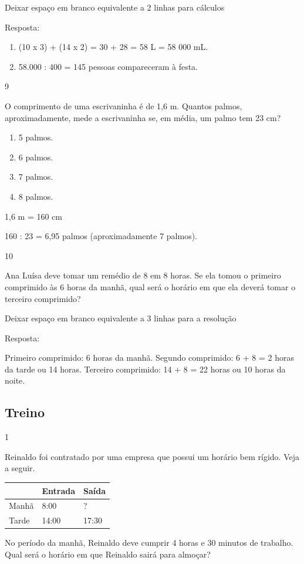 \begin{mdframed}[linewidth=2pt,linecolor=salmao,roundcorner=2pt]
\begin{itemize}
{\begin{itemize}
\begin{escolha}
Deixar espaço em branco equivalente a 2 linhas para cálculos

Resposta:

\begin{enumerate}
\item
  (10 x 3) + (14 x 2) = 30 + 28 = 58 L = 58 000 mL.
\item
  58.000 : 400 = 145 pessoas compareceram à festa.
\end{enumerate}

\num{9}

O comprimento de uma escrivaninha é de 1,6 m. Quantos palmos,
aproximadamente, mede a escrivaninha se, em média, um palmo tem 23 cm?

\begin{enumerate}
\item
  5 palmos.
\item
  6 palmos.
\item
  7 palmos.
\item
  8 palmos.
\end{enumerate}

1,6 m = 160 cm

160 : 23 = 6,95 palmos (aproximadamente 7 palmos).

\num{10}

Ana Luísa deve tomar um remédio de 8 em 8 horas. Se ela tomou o primeiro
comprimido às 6 horas da manhã, qual será o horário em que ela deverá tomar
o terceiro comprimido?

Deixar espaço em branco equivalente a 3 linhas para a resolução

Resposta:

Primeiro comprimido: 6 horas da manhã.
Segundo comprimido: 6 + 8 = 2 horas da tarde ou 14 horas.
Terceiro comprimido: 14 + 8 = 22 horas ou 10 horas da noite.

\subsection{Treino}

\num{1}

Reinaldo foi contratado por uma empresa que possui um horário bem rígido.
Veja a seguir.

\begin{longtable}[]{@{}lll@{}}
\toprule
& Entrada & Saída\tabularnewline
\midrule
\endhead
Manhã & 8:00 & ?\tabularnewline
Tarde & 14:00 & 17:30\tabularnewline
\bottomrule
\end{longtable}


No período da manhã, Reinaldo deve
cumprir 4 horas e 30 minutos de trabalho. Qual será o horário em que
Reinaldo sairá para almoçar?


\end{escolha}
\end{itemize}}
\end{itemize}
\end{mdframed}
